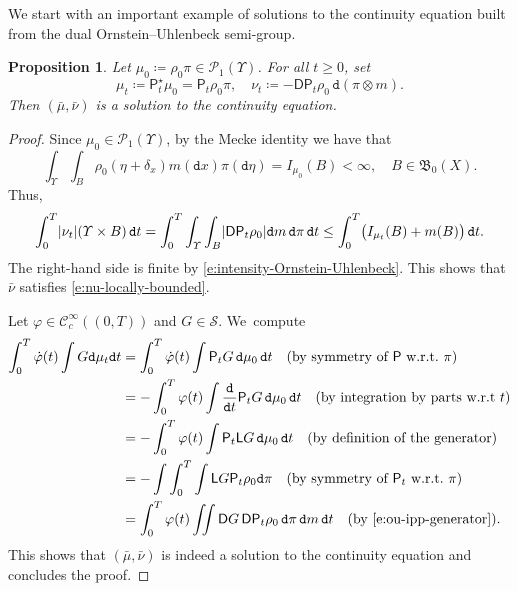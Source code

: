\documentclass[JEP,XML,SOM,Unicode,published]{cedram}
\newtheorem{proposition}[theorem]{Proposition}
\theoremstyle{definition}
\theoremstyle{remark}
\DeclarePairedDelimiter{\paren}{\lparen}{\rparen}
\DeclarePairedDelimiter{\abs}{\lvert}{\rvert}
\begin{document}
We start with an important example of solutions to the continuity equation built from the dual Ornstein--Uhlenbeck semi-group.
\begin{proposition}\label{t:ou-solution}
Let $\mu_{0} \coloneq \rho_{0} \pi \in \mathscr{P}_{1}(\varUpsilon)$.
For all $t \geq 0$, set
\begin{equation*}
\mu_{t} \coloneq \mathsf{P}^{\star}_{t} \mu_{0} = \mathsf{P}_{t} \rho_{0} \pi, \quad \nu_{t} \coloneq - \mathsf{D} \mathsf{P}_{t} \rho_{0}\, \mathtt{d} (\pi \otimes m).
\end{equation*}
Then $(\bar{\mu}, \bar{\nu})$ is a solution to the continuity equation.
\end{proposition}
\begin{proof}
Since $\mu_{0} \in \mathscr{P}_{1}(\varUpsilon)$, by the Mecke identity we have that
\begin{equation}\label{e:l1-loc}
\int_{\varUpsilon} \int_{B} \rho_{0}(\eta + \delta_{x}) m(\mathtt{d} x) \pi(\mathtt{d} \eta) = I_{\mu_{0}}(B) < \infty, \quad B \in \mathfrak{B}_{0}(X).
\end{equation}
Thus,
\begin{equation*}
\int_{0}^{T} \abs{\nu_{t}}(\varUpsilon \times B)\, \mathtt{d} t = \int_{0}^{T} \int_{\varUpsilon} \int_{B} \abs{\mathsf{D} \mathsf{P}_{t} \rho_{0}} \mathtt{d} m\, \mathtt{d} \pi\, \mathtt{d} t \leq \int_{0}^{T} \paren[\big]{ I_{\mu_{t}}(B) + m(B) }\, \mathtt{d} t.
\end{equation*}
The right-hand side is finite by \cref{e:intensity-Ornstein-Uhlenbeck}.
This shows that $\bar{\nu}$ satisfies \cref{e:nu-locally-bounded}.

Let $\varphi \in \mathscr{C}_{c}^{\infty}((0,T))$ and $G \in \mathscr{S}$. We~compute
\begin{equation*}
\begin{split}
\int_{0}^{T} \dot{\varphi}(t) \int G \mathtt{d} \mu_{t} \mathtt{d} t &= \int_{0}^{T} \dot{\varphi}(t) \int \mathsf{P}_{t} G\, \mathtt{d} \mu_{0}\, \mathtt{d} t \quad \text{(by symmetry of $\mathsf{P}$ w.r.t.~$\pi$)}\\
&= - \int_{0}^{T} \varphi(t) \int \frac{\mathtt{d}}{\mathtt{d} t} \mathsf{P}_{t} G\, \mathtt{d} \mu_{0}\, \mathtt{d} t \quad \text{(by integration by parts w.r.t~$t$)} \\
&= - \int_{0}^{T} \varphi(t) \int \mathsf{P}_{t} \mathsf{L} G\, \mathtt{d} \mu_{0}\, \mathtt{d} t \quad \text{(by definition of the generator)} \\
&= - \int \int_{0}^{T} \int \mathsf{L} G \mathsf{P}_{t} \rho_{0} \mathtt{d} \pi \quad \text{(by symmetry of $\mathsf{P}_{t}$ w.r.t.~$\pi$)} \\
&= \int_{0}^{T} \varphi(t) \iint \mathsf{D} G\, \mathsf{D} \mathsf{P}_{t} \rho_0\, \mathtt{d} \pi\, \mathtt{d} m\, \mathtt{d} t \quad \text{(by \cref{e:ou-ipp-generator})}.
\end{split}
\end{equation*}
This shows that $(\bar{\mu}, \bar{\nu})$ is indeed a solution to the continuity equation and concludes the proof.
\end{proof}
\end{document}
